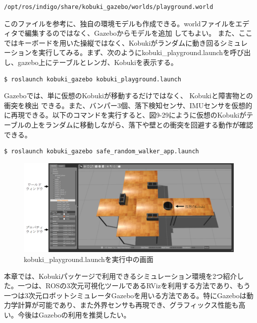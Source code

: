 \begin{itemize}
\begin{lstlisting}[language=ROS]
/opt/ros/indigo/share/kobuki_gazebo/worlds/playground.world
\end{lstlisting}

このファイルを参考に、独自の環境モデルも作成できる。worldファイルをエディタで編集するのではなく、Gazeboからモデルを追加  してもよい。
また、ここではキーボードを用いた操縦ではなく、Kobukiがランダムに動き回るシミュレーションを実行してみる。まず、次のようにkobuki\_playground.launchを呼び出し、gazebo上にテーブルとレンガ、Kobukiを表示する。

\begin{lstlisting}[language=ROS]
$ roslaunch kobuki_gazebo kobuki_playground.launch
\end{lstlisting}

Gazeboでは、単に仮想のKobukiが移動するだけではなく、  Kobukiと障害物との衝突を検出  できる。また、バンパー3個、落下検知センサ、IMUセンサを仮想的に再現できる。以下のコマンドを実行すると、図9-29にように仮想のKobukiがテーブルの上をランダムに移動しながら、落下や壁との衝突を回避する動作が確認できる。

\begin{lstlisting}[language=ROS]
$ roslaunch kobuki_gazebo safe_random_walker_app.launch
\end{lstlisting}

\begin{figure}[ht]
  \centering
  \includegraphics[width=\columnwidth]{pictures/chapter9/pic_09_29.png}
  \caption{kobuki\_playground.launchを実行中の画面}
\end{figure}


本章では、Kobukiパッケージで利用できるシミュレーション環境を2つ紹介した。一つは、ROSの3次元可視化ツールであるRVizを利用する方法であり、もう一つは3次元ロボットシミュレータGazeboを用いる方法である。特にGazeboは動力学計算が可能であり、また外界センサも再現でき、グラフィックス性能も高い。今後はGazeboの利用を推奨したい。


\end{itemize}
